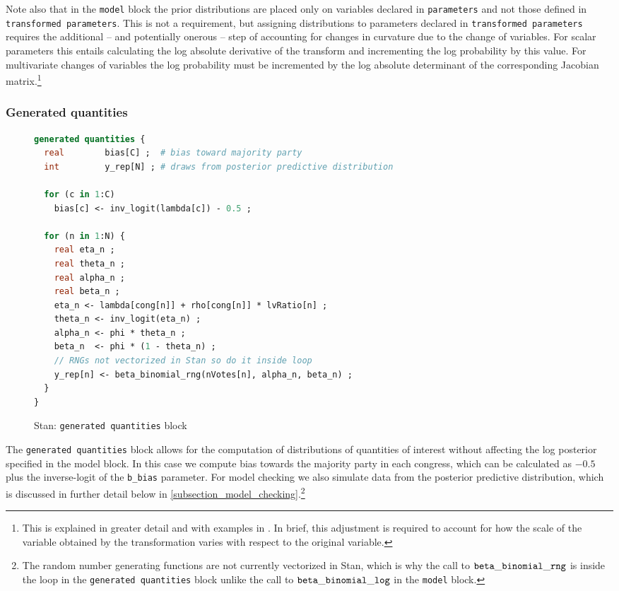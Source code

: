 Note also that in the {\tt model} block the prior distributions are placed only on variables declared in {\tt parameters}  and not those defined in {\tt transformed parameters}. This is not a requirement, but assigning distributions to parameters declared in {\tt transformed parameters} requires the additional -- and potentially onerous -- step of accounting for changes in curvature due to the change of variables. For scalar parameters this entails calculating the log absolute derivative of the transform and incrementing the log probability by this value. For multivariate changes of variables the log probability must be incremented by the log absolute determinant of the corresponding Jacobian matrix.\footnote{This is explained in greater detail and with examples in . In brief, this adjustment is required to account for how the scale of the variable obtained by the transformation varies with respect to the original variable.}




\subsubsection{Generated quantities}

\begin{figure}[h]
\begin{lstlisting}[language=Stan, frame=trBL]
generated quantities {
  real        bias[C] ;  # bias toward majority party
  int         y_rep[N] ; # draws from posterior predictive distribution
  
  for (c in 1:C) 
    bias[c] <- inv_logit(lambda[c]) - 0.5 ;
  
  for (n in 1:N) {
    real eta_n ;
    real theta_n ;
    real alpha_n ;
    real beta_n ;
    eta_n <- lambda[cong[n]] + rho[cong[n]] * lvRatio[n] ;
    theta_n <- inv_logit(eta_n) ;    
    alpha_n <- phi * theta_n ;
    beta_n  <- phi * (1 - theta_n) ;
    // RNGs not vectorized in Stan so do it inside loop
    y_rep[n] <- beta_binomial_rng(nVotes[n], alpha_n, beta_n) ;
  }
}
\end{lstlisting}
\caption{Stan: {\tt generated quantities} block}
\label{stan_generated_quantities}
\end{figure}

The {\tt generated quantities} block allows for the computation of distributions of quantities of interest without affecting the log posterior specified in the model block. In this case we compute bias towards the majority party in each congress, which can be calculated as $-0.5$ plus the inverse-logit of the {\tt b\_bias} parameter. For model checking we also simulate data from the posterior predictive distribution, which is discussed in further detail below in \ref{subsection_model_checking}.\footnote{The random number generating functions are not currently vectorized in Stan, which is why the call to ${\tt beta\_binomial\_rng}$ is inside the loop in the {\tt generated quantities} block unlike the call to ${\tt beta\_binomial\_log}$ in the {\tt model} block.} 




